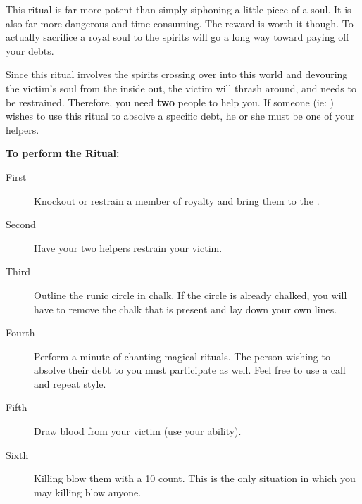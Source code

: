 \documentclass[green]{NeptuneBall}
\begin{document}
\name{\gRitual{}}

This ritual is far more potent than simply siphoning a little piece of a soul. It is also far more dangerous and time consuming. The reward is worth it though. To actually sacrifice a royal soul to the spirits will go a long way toward paying off your debts.

Since this ritual involves the spirits crossing over into this world and devouring the victim's soul from the inside out, the victim will thrash around, and needs to be restrained. Therefore, you need {\bf two} people to help you. If someone (ie: \cAriel{}) wishes to use this ritual to absolve a specific debt, he or she must be one of your helpers.

{\bf To perform the Ritual:}
\begin{description}
\item[First] Knockout or restrain a member of royalty and bring them to the \sRunicCircle{}.
\item[Second] Have your two helpers restrain your victim.
\item [Third] Outline the runic circle in chalk. If the circle is already chalked, you will have to remove the chalk that is present and lay down your own lines.
\item[Fourth] Perform a minute of chanting magical rituals. The person wishing to absolve their debt to you must participate as well. Feel free to use a call and repeat style.
\item[Fifth] Draw blood from your victim (use your ability).
\item[Sixth] Killing blow them with a 10 count. This is the only situation in which you may killing blow anyone.

\end{description}
\end{document}
